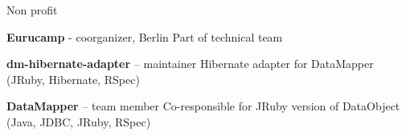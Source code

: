\begin{rubric}{Non profit}


\entry*[2012--2013--\ldots]
  \textbf{Eurucamp} - coorganizer, Berlin
\entry*
  Part of technical team

  
  
\entry*[01.2010--\ldots]
  \textbf{dm-hibernate-adapter} -- maintainer
\entry*
  Hibernate adapter for DataMapper (JRuby, Hibernate, RSpec)

\entry*[01.2009--12.2009]
  \textbf{DataMapper}  -- team member
\entry*
  Co-responsible for JRuby version of DataObject (Java, JDBC, JRuby, RSpec)
  
\end{rubric}